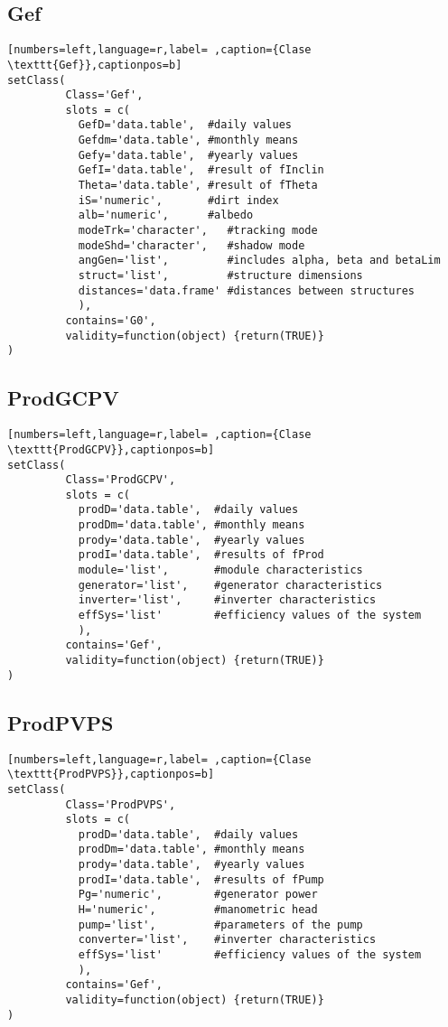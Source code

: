 \subsection{Gef}
\label{sec:org71ae08d}
\begin{lstlisting}[numbers=left,language=r,label= ,caption={Clase \texttt{Gef}},captionpos=b]
setClass(
         Class='Gef',
         slots = c(
           GefD='data.table',  #daily values
           Gefdm='data.table', #monthly means
           Gefy='data.table',  #yearly values
           GefI='data.table',  #result of fInclin
           Theta='data.table', #result of fTheta
           iS='numeric',       #dirt index
           alb='numeric',      #albedo
           modeTrk='character',   #tracking mode
           modeShd='character',   #shadow mode
           angGen='list',         #includes alpha, beta and betaLim
           struct='list',         #structure dimensions
           distances='data.frame' #distances between structures
           ),
         contains='G0',
         validity=function(object) {return(TRUE)}
)
\end{lstlisting}
\subsection{ProdGCPV}
\label{sec:orgcb2a498}
\begin{lstlisting}[numbers=left,language=r,label= ,caption={Clase \texttt{ProdGCPV}},captionpos=b]
setClass(
         Class='ProdGCPV',
         slots = c(
           prodD='data.table',  #daily values
           prodDm='data.table', #monthly means
           prody='data.table',  #yearly values
           prodI='data.table',  #results of fProd
           module='list',       #module characteristics
           generator='list',    #generator characteristics
           inverter='list',     #inverter characteristics
           effSys='list'        #efficiency values of the system
           ),
         contains='Gef',
         validity=function(object) {return(TRUE)}
)
\end{lstlisting}
\subsection{ProdPVPS}
\label{sec:org00a50b9}
\begin{lstlisting}[numbers=left,language=r,label= ,caption={Clase \texttt{ProdPVPS}},captionpos=b]
setClass(
         Class='ProdPVPS',
         slots = c(
           prodD='data.table',  #daily values
           prodDm='data.table', #monthly means
           prody='data.table',  #yearly values
           prodI='data.table',  #results of fPump
           Pg='numeric',        #generator power
           H='numeric',         #manometric head
           pump='list',         #parameters of the pump
           converter='list',    #inverter characteristics
           effSys='list'        #efficiency values of the system
           ),
         contains='Gef',
         validity=function(object) {return(TRUE)}
)
\end{lstlisting}
